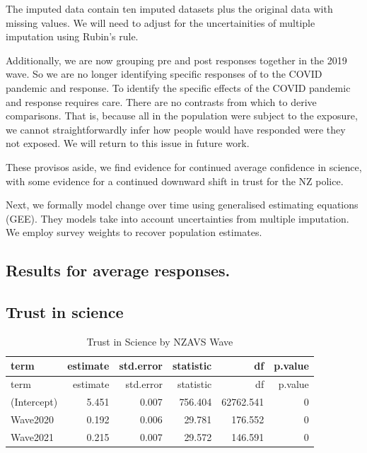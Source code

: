 \documentclass[
  singlecolumn]{report}
\begin{document}
The imputed data contain ten imputed datasets plus the original data
with missing values. We will need to adjust for the uncertainities of
multiple imputation using Rubin's rule.

Additionally, we are now grouping pre and post responses together in the
2019 wave. So we are no longer identifying specific responses of to the
COVID pandemic and response. To identify the specific effects of the
COVID pandemic and response requires care. There are no contrasts from
which to derive comparisons. That is, because all in the population were
subject to the exposure, we cannot straightforwardly infer how people
would have responded were they not exposed. We will return to this issue
in future work.

These provisos aside, we find evidence for continued average confidence
in science, with some evidence for a continued downward shift in trust
for the NZ police.

Next, we formally model change over time using generalised estimating
equations (GEE). They models take into account uncertainties from
multiple imputation. We employ survey weights to recover population
estimates.

\hypertarget{results-for-average-responses.}{%
\subsection{Results for average
responses.}\label{results-for-average-responses.}}

\hypertarget{trust-in-science}{%
\subsection{Trust in science}\label{trust-in-science}}

\begin{longtable}[]{@{}lrrrrr@{}}
\caption{Trust in Science by NZAVS Wave }\tabularnewline
\toprule\noalign{}
term & estimate & std.error & statistic & df & p.value \\
\midrule\noalign{}
\endfirsthead
\toprule\noalign{}
term & estimate & std.error & statistic & df & p.value \\
\midrule\noalign{}
\endhead
\bottomrule\noalign{}
\endlastfoot
(Intercept) & 5.451 & 0.007 & 756.404 & 62762.541 & 0 \\
Wave2020 & 0.192 & 0.006 & 29.781 & 176.552 & 0 \\
Wave2021 & 0.215 & 0.007 & 29.572 & 146.591 & 0 \\
\end{longtable}
\end{document}
